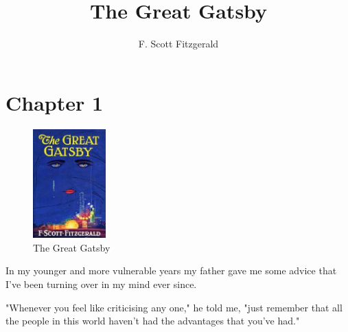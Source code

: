 \documentclass[a4paper,12pt]{article}
\title{The Great Gatsby}
\author{F. Scott Fitzgerald}
\date{}
\begin{document}
\maketitle
\section{Chapter 1}

\begin{figure}[b!]
   \centering
     \includegraphics[width=0.25\textwidth]{images/jacket.jpg}
   \caption{The Great Gatsby}
\end{figure}

In my younger and more vulnerable years my father gave me some advice that I've been turning over in my mind ever since.

"Whenever you feel like criticising any one," he told me, "just
remember that all the people in this world haven't had the advantages
that you've had." \cite{my_cite_ref}



\end{document}
